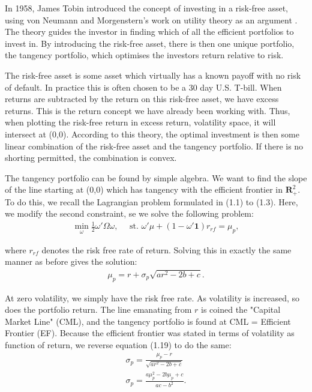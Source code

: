 \documentclass[11pt,a4paper,oneside]{article}
\newcommand{\lp}{\left(}
\newcommand{\rp}{\right)}
\newcommand{\rr}{\mathbf{R}}
\begin{document}
In 1958, James Tobin introduced the concept of investing in a risk-free asset, using von Neumann and Morgenstern's work on utility theory as an argument \cite{tobin58}. The theory guides the investor in finding which of all the efficient portfolios to invest in. By introducing the risk-free asset, there is then one unique portfolio, the tangency portfolio, which optimises the investors return relative to risk.

The risk-free asset is some asset which virtually has a known payoff with no risk of default. In practice this is often chosen to be a 30 day U.S. T-bill. When returns are subtracted by the return on this risk-free asset, we have excess returns. This is the return concept we have already been working with. Thus, when plotting the risk-free return in excess return, volatility space, it will intersect at (0,0). According to this theory, the optimal investment is then some linear combination of the risk-free asset and the tangency portfolio. If there is no shorting permitted, the combination is convex.

The tangency portfolio can be found by simple algebra. We want to find the slope of the line starting at (0,0) which has tangency with the efficient frontier in $\rr^2_+$. To do this, we recall the Lagrangian problem formulated in (1.1) to (1.3). Here, we modify the second constraint, se we solve the following problem:
\begin{align}
    \min_{\omega} \frac{1}{2}\omega'\Omega\omega,\quad \text{ st. } \omega'\mu + \lp 1 - \omega'\mathbf{1}\rp r_{rf} = \mu_p,
\end{align}

where $r_{rf}$ denotes the risk free rate of return. Solving this in exactly the same manner as before gives the solution:
\begin{align}
    \mu_p = r + \sigma_p \sqrt{ar^2 - 2b + c}. 
\end{align}

At zero volatility, we simply have the risk free rate. As volatility is increased, so does the portfolio return. The line emanating from $r$ is coined the "Capital Market Line" (CML), and the tangency portfolio is found at CML = Efficient Frontier (EF). Because the efficient frontier was stated in terms of volatility as function of return, we reverse equation (1.19) to do the same:
\begin{align*}
    \sigma_p = \frac{\mu_p - r}{\sqrt{ar^2 - 2b + c}} \tag{CML} \\
    \sigma_p = \frac{a\mu_p^2 - 2b\mu_p + c}{ac-b^2} \tag{EF}.
\end{align*}
\end{document}
